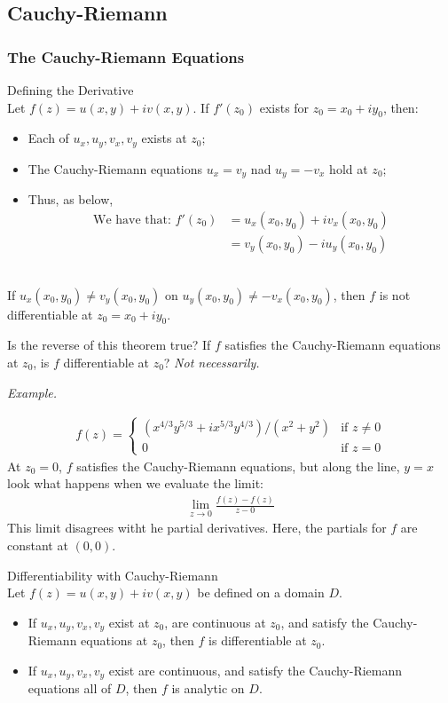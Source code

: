 \documentclass[10pt]{paper}
\newcommand{\gspc}{\vspace{0.13cm}} %
\newcommand{\gline}[0]{\gspc\\} %
\renewenvironment{example}{
  \begin{tcolorbox}[colback=gray!2, colframe=gray!40!white, coltitle=green!20!black, boxrule=3pt, sharp corners, breakable]
    \textit{Example.}
}{\end{tcolorbox}}
\begin{document}
\subsection{Cauchy-Riemann}
\subsubsection{The Cauchy-Riemann Equations}
\begin{theorem}{Defining the Derivative}{}\gline{}
  Let $f(z) = u(x,y)+iv(x,y)$. If $f'(z_0)$ exists for $z_0 = x_0 + iy_0$, then:
  \begin{itemize}
    \item Each of $u_x, u_y, v_x, v_y$ exists at $z_0$;
    \item The Cauchy-Riemann equations $u_x = v_y$ nad $u_y = -v_x$ hold at $z_0$;
    \item Thus, as below, \begin{align*}
      \text{We have that: }f'(z_0)&=u_x(x_0,y_0)+iv_x(x_0,y_0)\\
      &= v_y(x_0,y_0)-iu_y(x_0,y_0)
    \end{align*}
  \end{itemize}
  \begin{corollary}{}{}\gline{}
    If $u_x(x_0,y_0)\ne v_y(x_0,y_0)$ on $u_y(x_0,y_0)\ne-v_x(x_0,y_0)$, then $f$ is not differentiable at $z_0=x_0+iy_0$. 
  \end{corollary}
\end{theorem}
\noindent Is the reverse of this theorem true? If $f$ satisfies the Cauchy-Riemann equations at $z_0$, is $f$ differentiable at $z_0$? \textit{Not necessarily. }\gline{}
\begin{example}
  \begin{align*}
    f(z)=\begin{cases}
      (x^{4/3}y^{5/3}+ix^{5/3}y^{4/3})/(x^2+y^2)&\text{if }z\ne 0\\
      0&\text{if }z =0
    \end{cases}
  \end{align*}
  At $z_0 = 0$, $f$ satisfies the Cauchy-Riemann equations, but along the line, $y=x$ look what happens when we evaluate the limit:
  \begin{align*}
    \lim_{z\to0}\frac{f(z)-f(z)}{z-0}
  \end{align*}
  This limit disagrees witht he partial derivatives. Here, the partials for $f$ are constant at $(0,0)$. 
\end{example}
\begin{theorem}{Differentiability with Cauchy-Riemann}{}\gline{}
  Let $f(z) = u(x,y) + iv(x,y)$ be defined on a domain $D$.
  \begin{itemize}
    \item If $u_x,u_y, v_x, v_y$ exist at $z_0$, are continuous at $z_0$, and satisfy the Cauchy-Riemann equations at $z_0$, then $f$ is differentiable at $z_0$.
    \item If $u_x,u_y, v_x, v_y$ exist are continuous, and satisfy the Cauchy-Riemann equations all of $D$, then $f$ is analytic on $D$.
  \end{itemize}
\end{theorem}
\end{document}
